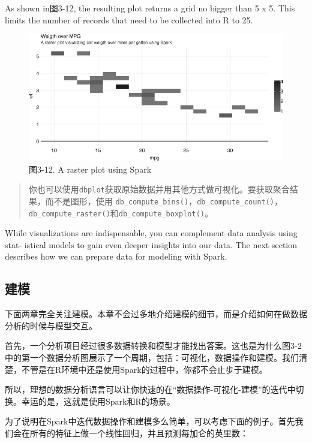 \documentclass[
]{article}
\begin{document}
As shown in图3-12, the resulting plot returns a grid no bigger than 5 x
5. This limits the number of records that need to be collected into R to
25.

\begin{figure}
\centering
\includegraphics{figures/3_12.png}
\caption{图3-12. A raster plot using Spark}
\end{figure}

\begin{quote}
你也可以使用\texttt{dbplot}获取原始数据并用其他方式做可视化。要获取聚合结果，而不是图形，使用
\texttt{db\_compute\_bins()}，\texttt{db\_compute\_count()}，\texttt{db\_compute\_raster()}和\texttt{db\_compute\_boxplot()}。
\end{quote}

While visualizations are indispensable, you can complement data analysis
using stat‐ istical models to gain even deeper insights into our data.
The next section describes how we can prepare data for modeling with
Spark.

\hypertarget{ux5efaux6a21-1}{%
\subsection{建模}\label{ux5efaux6a21-1}}

下面两章完全关注建模。本章不会过多地介绍建模的细节，而是介绍如何在做数据分析的时候与模型交互。

首先，一个分析项目经过很多数据转换和模型才能找出答案。这也是为什么图3-2中的第一个数据分析图展示了一个周期，包括：可视化，数据操作和建模。我们清楚，不管是在R环境中还是使用Spark的过程中，你都不会止步于建模。

所以，理想的数据分析语言可以让你快速的在``数据操作-可视化-建模''的迭代中切换。幸运的是，这就是使用Spark和R的场景。

为了说明在Spark中迭代数据操作和建模多么简单，可以考虑下面的例子。首先我们会在所有的特征上做一个线性回归，并且预测每加仑的英里数：
\end{document}
